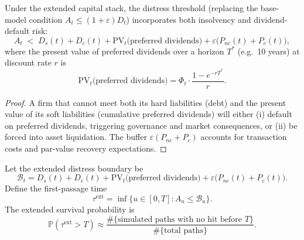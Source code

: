 \begin{proposition}\label{prop:distress}
Under the extended capital stack, the distress threshold (replacing the
base-model condition $A_t \le (1+\varepsilon)D_t$) incorporates both
insolvency and dividend-default risk:
\begin{equation}\label{eq:distress_ext}
  A_t \;<\; D_s(t) + D_c(t) + \mathrm{PV}_t\!\bigl(\text{preferred dividends}\bigr)
  + \varepsilon\bigl(P_{nc}(t) + P_c(t)\bigr),
\end{equation}
where the present value of preferred dividends over a horizon $T^*$
(e.g.\ 10 years) at discount rate $r$ is
\begin{equation}\label{eq:pv_pfd}
  \mathrm{PV}_t\!\bigl(\text{preferred dividends}\bigr)
  = \Phi_t \cdot \frac{1 - e^{-r T^*}}{r}.
\end{equation}
\end{proposition}

\begin{proof}
A firm that cannot meet both its hard liabilities (debt) and the present
value of its soft liabilities (cumulative preferred dividends) will either
(i) default on preferred dividends, triggering governance and market
consequences, or (ii) be forced into asset liquidation.  The buffer
$\varepsilon(P_{nc}+P_c)$ accounts for transaction costs and par-value
recovery expectations.
\end{proof}

\begin{definition}\label{def:survival_ext}
Let the extended distress boundary be
\begin{equation}\label{eq:distress_boundary}
  \mathcal{B}_t = D_s(t) + D_c(t)
  + \mathrm{PV}_t\!\bigl(\text{preferred dividends}\bigr)
  + \varepsilon\bigl(P_{nc}(t) + P_c(t)\bigr).
\end{equation}
Define the first-passage time
\begin{equation}\label{eq:tau_ext}
  \tau^{\mathrm{ext}} = \inf\bigl\{u \in [0,T] : A_u \le \mathcal{B}_u\bigr\}.
\end{equation}
The extended survival probability is
\begin{equation}\label{eq:surv_ext}
  \mathbb{P}\!\left(\tau^{\mathrm{ext}} > T\right)
  \approx
  \frac{\#\{\text{simulated paths with no hit before } T\}}
       {\#\{\text{total paths}\}}.
\end{equation}
\end{definition}

